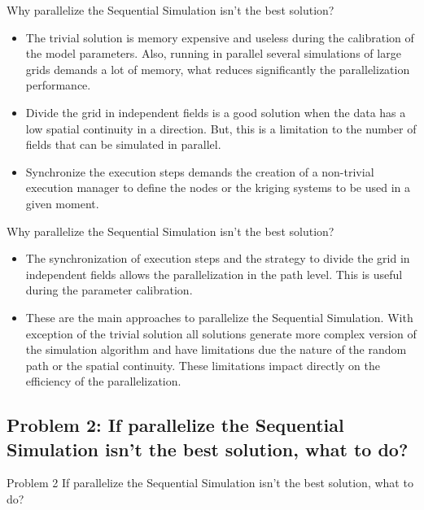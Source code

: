 \begin{frame}{Why parallelize the Sequential Simulation isn't the best solution?}
	\begin{itemize}
    	\item The trivial solution is memory expensive and useless during the calibration of the model parameters. Also, running in parallel several simulations of large grids demands a lot of memory, what reduces significantly the parallelization performance.
        \item Divide the grid in independent fields is a good solution when the data has a low spatial continuity in a direction. But, this is a limitation to the number of fields that can be simulated in parallel.
        \item Synchronize the execution steps demands the creation of a non-trivial execution manager to define the nodes or the kriging systems to be used in a given moment.
    \end{itemize}
\end{frame}


\begin{frame}{Why parallelize the Sequential Simulation isn't the best solution?}
	\begin{itemize}
    	\item The synchronization of execution steps and the strategy to divide the grid in independent fields allows the parallelization in the path level. This is useful during the parameter calibration.
        \item These are the main approaches to parallelize the Sequential Simulation. With exception of the trivial solution all solutions generate more complex version of the simulation algorithm and have limitations due the nature of the random path or the spatial continuity. These limitations impact directly on the efficiency of the parallelization.
    \end{itemize}
\end{frame}

\subsection{Problem 2: If parallelize the Sequential Simulation isn't the best solution, what to do?}
\begin{frame}{Problem 2}	
If parallelize the Sequential Simulation isn't the best solution, what to do? 
\end{frame}

